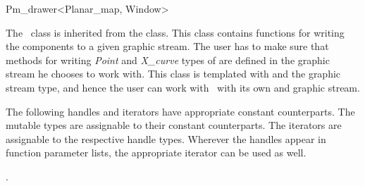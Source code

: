
\ccRefPageBegin


\begin{ccRefClass}{Pm_drawer<Planar_map, Window>}


\ccDefinition
The \ccRefName\ class is inherited from the  class. 
This class contains functions for writing the  components to a given graphic stream.
The user has to make sure that methods for writing {\em Point} and {\em X\_curve} types of  are defined in the graphic stream he chooses to work with.
This class is templated with  and the graphic stream type, and hence the user can work with \ccRefName\ with its own  and graphic stream. 
 

\ccTypes

The following handles and iterators have appropriate constant counterparts. The mutable types are assignable to their
constant counterparts. The iterators are assignable to the respective handle types. 
Wherever the handles appear in function parameter lists, the appropriate iterator can be used as well. 

.


\end{ccRefClass}

